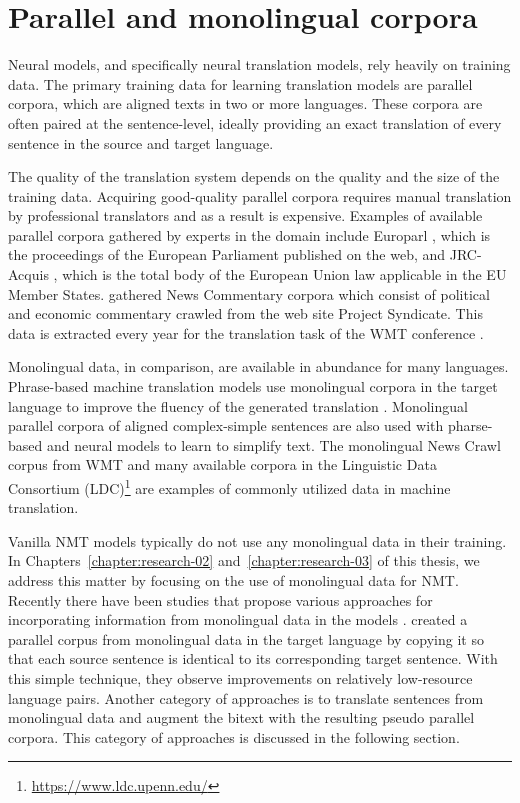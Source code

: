 \section{Parallel and monolingual corpora} \label{databg}

Neural models, and specifically neural translation models, rely heavily on training data. 
The primary training data for learning translation models are parallel corpora, which are aligned texts in two or more languages. 
These corpora are often paired at the sentence-level, ideally providing an exact translation of every sentence in the source and target language. 

The quality of the translation system depends on the quality and the size of the training data. 
Acquiring good-quality parallel corpora requires manual translation by professional translators and as a result is expensive.
Examples of available parallel corpora gathered by experts in the domain include Europarl
\citep{koehn2005europarl}, which is the proceedings of the European Parliament published on the web, and JRC-Acquis 
\citep{steinberger2006jrc}, which is the total body of the European Union law applicable in the EU Member States.
\citet{callisonburch-EtAl:2007:WMT} gathered News Commentary corpora which consist of political and economic commentary crawled from the web site Project Syndicate.
This data is extracted every year for the translation task of the WMT conference \citep{barrault-EtAl:2019:WMT}. 

Monolingual data, in comparison, are available in abundance for many languages. 
Phrase-based machine translation models use monolingual corpora in the target language \citep{koehn-etal-2003-statistical, brants-etal-2007-large, koehn-etal-2007-moses} to improve the fluency of the generated translation \citep{lembersky-etal-2011-language}. 
Monolingual parallel corpora of aligned complex-simple sentences are also used with pharse-based \citep{wubben-etal-2012-sentence,kajiwara-komachi-2016-building} and neural \citep{zhang-lapata-2017-sentence} models to learn to simplify text.
The monolingual News Crawl corpus from WMT and many available corpora in the Linguistic Data Consortium (LDC)\footnote{\url{https://www.ldc.upenn.edu/}} are examples of commonly utilized data in machine translation.

Vanilla NMT models typically do not use any monolingual data in their training. 
In Chapters~\ref{chapter:research-02} and~\ref{chapter:research-03} of this thesis, we address this matter by focusing on the use of monolingual data for NMT.
Recently there have been studies that propose various approaches for incorporating information from monolingual data in the models \citep{domhan-hieber-2017-using,burlot-yvon-2018-using,currey-heafield-2019-zero}. 
\citet{currey2017copied} created a parallel corpus from monolingual data in the target language by copying it so that each source sentence is identical to its corresponding target sentence. With this simple technique, they observe improvements on relatively low-resource language pairs.
Another category of approaches is to translate sentences from monolingual data and augment the bitext with the resulting pseudo parallel corpora. 
This category of approaches is discussed in the following section.

